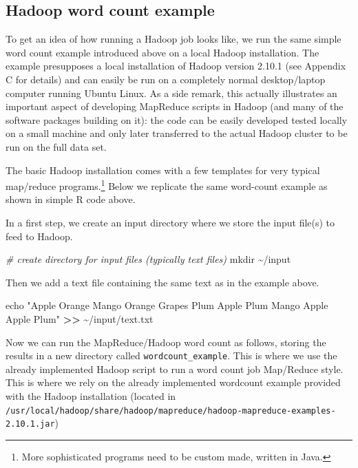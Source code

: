 \documentclass[
  12pt,
]{style/krantz}
\newenvironment{Shaded}{\begin{snugshade}}{\end{snugshade}}
\newcommand{\BuiltInTok}[1]{#1}
\newcommand{\CommentTok}[1]{\textcolor[rgb]{0.56,0.35,0.01}{\textit{#1}}}
\newcommand{\FunctionTok}[1]{\textcolor[rgb]{0.00,0.00,0.00}{#1}}
\newcommand{\NormalTok}[1]{#1}
\newcommand{\OperatorTok}[1]{\textcolor[rgb]{0.81,0.36,0.00}{\textbf{#1}}}
\newcommand{\StringTok}[1]{\textcolor[rgb]{0.31,0.60,0.02}{#1}}
\begin{document}
\hypertarget{hadoop-word-count-example}{%
\subsection{Hadoop word count example}\label{hadoop-word-count-example}}

To get an idea of how running a Hadoop job looks like, we run the same simple word count example introduced above on a local Hadoop installation. The example presupposes a local installation of Hadoop version 2.10.1 (see Appendix C for details) and can easily be run on a completely normal desktop/laptop computer running Ubuntu Linux. As a side remark, this actually illustrates an important aspect of developing MapReduce scripts in Hadoop (and many of the software packages building on it): the code can be easily developed tested locally on a small machine and only later transferred to the actual Hadoop cluster to be run on the full data set.

The basic Hadoop installation comes with a few templates for very typical map/reduce programs.\footnote{More sophisticated programs need to be custom made, written in Java.} Below we replicate the same word-count example as shown in simple R code above.

In a first step, we create an input directory where we store the input file(s) to feed to Hadoop.

\begin{Shaded}
\begin{Highlighting}[]
\CommentTok{\# create directory for input files (typically text files)}
\FunctionTok{mkdir}\NormalTok{ \textasciitilde{}/input}
\end{Highlighting}
\end{Shaded}

Then we add a text file containing the same text as in the example above.

\begin{Shaded}
\begin{Highlighting}[]
\BuiltInTok{echo} \StringTok{"Apple Orange Mango}
\StringTok{Orange Grapes Plum}
\StringTok{Apple Plum Mango}
\StringTok{Apple Apple Plum"} \OperatorTok{\textgreater{}\textgreater{}}\NormalTok{  \textasciitilde{}/input/text.txt}
\end{Highlighting}
\end{Shaded}

Now we can run the MapReduce/Hadoop word count as follows, storing the results in a new directory called \texttt{wordcount\_example}. This is where we use the already implemented Hadoop script to run a word count job Map/Reduce style. This is where we rely on the already implemented wordcount example provided with the Hadoop installation (located in \texttt{/usr/local/hadoop/share/hadoop/mapreduce/hadoop-mapreduce-examples-2.10.1.jar})
\end{document}
